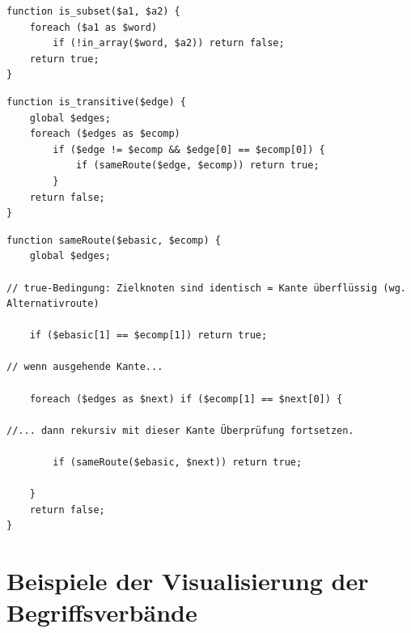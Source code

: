\documentclass[pagesize,paper=A4,DIV=calc,fontsize=12pt,draft=false]{scrreprt}
\begin{document}
\begin{lstlisting}[caption={Überprüfung, ob \texttt{\$a1} Untermenge von \texttt{\$a2} ist}]
function is_subset($a1, $a2) {
	foreach ($a1 as $word) 
		if (!in_array($word, $a2)) return false;
	return true;
}
\end{lstlisting}

\lstset{
language=PHP
}

\begin{lstlisting}[caption={Überprüfung, ob eine Kante überflüssig ist. 
Wenn der Ausgangsknoten beider Kanten gleich ist, wird überprüft, ob ein Alternativpfad existiert.}]
function is_transitive($edge) {
	global $edges;
	foreach ($edges as $ecomp) 
		if ($edge != $ecomp && $edge[0] == $ecomp[0]) { 
			if (sameRoute($edge, $ecomp)) return true;
		}
	return false;
}
\end{lstlisting}

\lstset{
language=PHP
}

\begin{lstlisting}[caption={Überprüfung, ob \texttt{\$ecomp} über andere ausgehende Kanten zum Zielknoten von \texttt{\$ebasic} führt.}]
function sameRoute($ebasic, $ecomp) {
	global $edges;

// true-Bedingung: Zielknoten sind identisch = Kante überflüssig (wg. Alternativroute)

	if ($ebasic[1] == $ecomp[1]) return true;

// wenn ausgehende Kante...

	foreach ($edges as $next) if ($ecomp[1] == $next[0]) {

//... dann rekursiv mit dieser Kante Überprüfung fortsetzen.
		
		if (sameRoute($ebasic, $next)) return true; 

	}
	return false;
}
\end{lstlisting}

\section{Beispiele der Visualisierung der Begriffsverbände}


\end{document}
